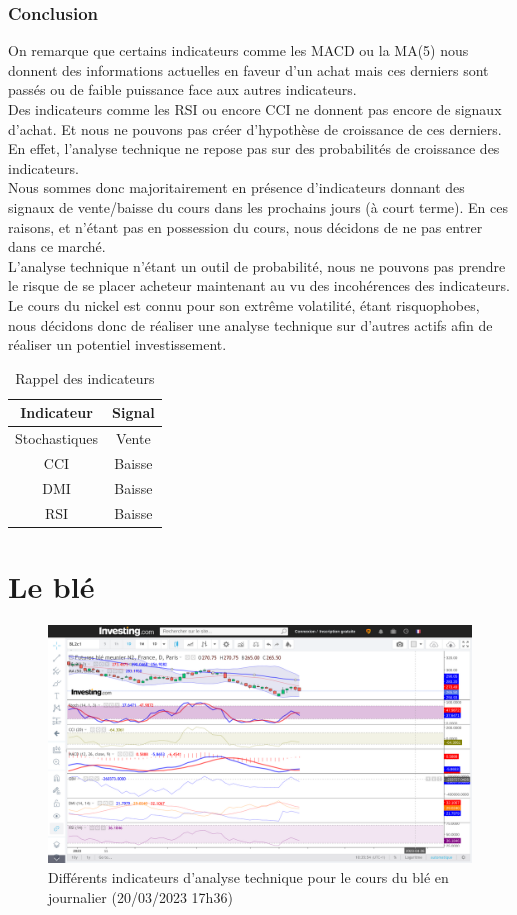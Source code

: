\documentclass[12pt,a4paper]{article}
\begin{document}
\subsubsection*{Conclusion}
On remarque que certains indicateurs comme les MACD ou la MA(5)  nous donnent des informations actuelles en faveur d'un achat mais ces derniers sont passés ou de faible 
puissance face aux autres indicateurs.\\
Des indicateurs comme les RSI ou encore CCI ne donnent pas encore de signaux d'achat. Et nous ne pouvons pas créer d'hypothèse de croissance de ces derniers. En effet, 
l'analyse technique ne repose pas sur des probabilités de croissance des indicateurs.\\
Nous sommes donc majoritairement en présence d'indicateurs donnant des signaux de vente/baisse du cours dans les prochains jours (à court terme). En ces raisons, et 
n'étant pas en possession du cours, nous décidons de ne pas entrer dans ce marché.\\
L'analyse technique n'étant un outil de probabilité, nous ne pouvons pas prendre le risque de se placer acheteur maintenant au vu des incohérences des indicateurs. 
Le cours du nickel est connu pour son extrême volatilité, étant risquophobes, nous décidons donc de réaliser une analyse technique sur d'autres actifs afin de réaliser un 
potentiel investissement.
\begin{table}[H]
    \centering
    \caption{Rappel des indicateurs}
    \begin{tabular}{cc}
    \toprule
    Indicateur     & Signal       \\
    \midrule
    Stochastiques  & Vente        \\
    CCI            & Baisse       \\
    DMI            & Baisse       \\
    RSI            & Baisse        \\
    \bottomrule
    \end{tabular}
\end{table}

\appendix
\section{Le blé}
\begin{figure}[H]
    \centering
    \includegraphics[width=\textwidth]{image1.png}
    \caption{Différents indicateurs d'analyse technique pour le cours du blé en journalier (20/03/2023 17h36)}
\end{figure}
\end{document}
